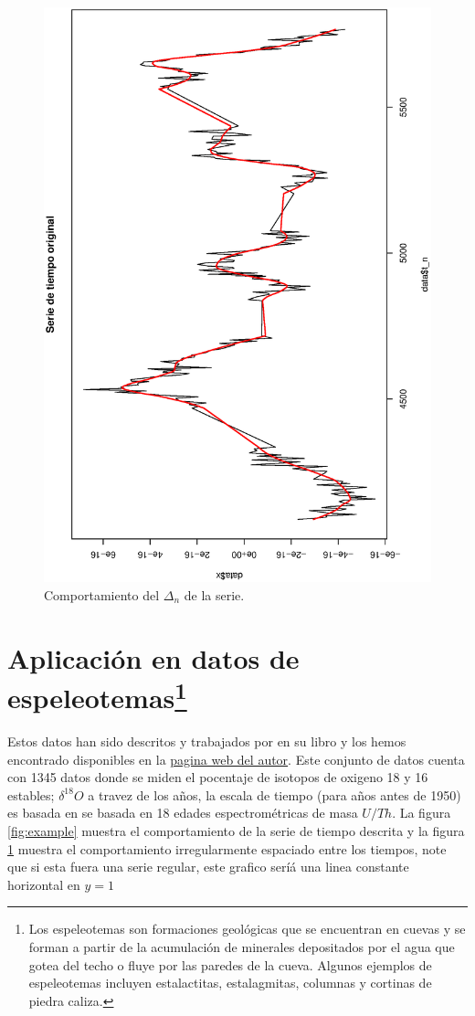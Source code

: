 \begin{figure}[h]
\begin{minipage}{0.45\textwidth}
    \includegraphics[width=0.8\linewidth,angle = 270]{Kap3/Fig_Cap3/agn_loess.eps}
    \caption{Comportamiento del $\Delta_n$ de la serie.}
    \label{fig:example_delta}
    \end{minipage}
\end{figure}



\section{Aplicación en datos de espeleotemas\protect\footnote{Los espeleotemas son formaciones geológicas que se encuentran en cuevas y se forman a partir de la acumulación de minerales depositados por el agua que gotea del techo o fluye por las paredes de la cueva. Algunos ejemplos de espeleotemas incluyen estalactitas, estalagmitas, columnas y cortinas de piedra caliza.}}

Estos datos han sido descritos y trabajados por \cite{mudelse2014climate} en su libro y los hemos encontrado disponibles en la \href{https://www.manfredmudelsee.com/}{pagina web del autor}. Este conjunto de datos cuenta con 1345 datos donde se miden el pocentaje de 
isotopos de oxigeno 18 y 16 estables; $\delta^{18}O$ a travez de los años, la escala de tiempo (para años antes de 1950) es basada en
se basada en 18 edades espectrométricas de masa $U/Th$. La figura \ref{fig:example} muestra el comportamiento de la serie de tiempo descrita y la figura 
\ref{fig:example_delta} muestra el comportamiento irregularmente espaciado entre los tiempos, note que si esta fuera una serie regular, este grafico seríá una
linea constante horizontal en $y=1$



